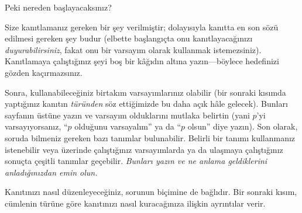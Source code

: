 \documentclass[../../../include/open-logic-section]{subfiles}
\begin{document}


Peki nereden başlayacaksınız?

Size kanıtlamanız gereken bir şey verilmiştir; dolayısıyla kanıtta en
son sözü edilmesi gereken şey budur (elbette başlangıçta onu
kanıtlayacağınızı \emph{duyurabilirsiniz}, fakat onu bir varsayım olarak
kullanmak istemezsiniz). Kanıtlamaya çalıştığınız şeyi boş bir kâğıdın
altına yazın---böylece hedefinizi gözden kaçırmazsınız.

Sonra, kullanabileceğiniz birtakım varsayımlarınız olabilir (bir
sonraki kısımda yaptığınız kanıtın \emph{türünden} söz ettiğimizde bu
daha açık hâle gelecek). Bunları sayfanın üstüne yazın ve varsayım
olduklarını mutlaka belirtin (yani $p$'yi varsayıyorsanız, ``$p$ olduğunu
varsayalım'' ya da ``$p$ olsun'' diye yazın). Son olarak, soruda
bilmeniz gereken bazı tanımlar bulunabilir. Belirli bir tanımı
kullanmanız istenebilir veya üzerinde çalıştığınız varsayımlarda ya da
ulaşmaya çalıştığınız sonuçta çeşitli tanımlar geçebilir. \emph{Bunları
yazın ve ne anlama geldiklerini anladığınızdan emin olun.}

Kanıtınızı nasıl düzenleyeceğiniz, sorunun biçimine de bağlıdır. Bir
sonraki kısım, cümlenin türüne göre kanıtınızı nasıl kuracağınıza
ilişkin ayrıntılar verir.
\end{document}
